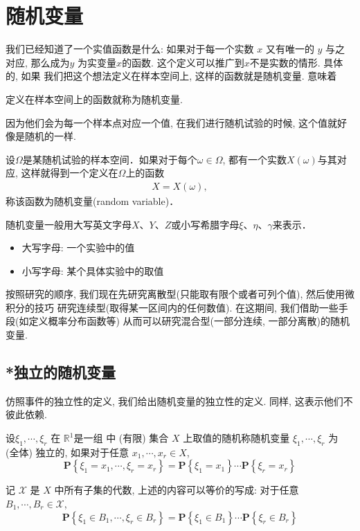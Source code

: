 \section{随机变量}

我们已经知道了一个实值函数是什么: 如果对于每一个实数 $x$ 又有唯一的 $y$ 与之对应,
那么成为$y$ 为实变量$x$的函数. 这个定义可以推广到$x$不是实数的情形. 具体的, 如果
我们把这个想法定义在样本空间上, 这样的函数就是随机变量. 意味着

\begin{definition*}
    定义在样本空间上的函数就称为随机变量.
\end{definition*}

因为他们会为每一个样本点对应一个值, 在我们进行随机试验的时候, 这个值就好像是随机的一样.

\begin{definition}[随机变量]
    设$\Omega$是某随机试验的样本空间．如果对于每个$\omega\in\Omega$, 都有一个实数$X(\omega)$与其对应, 这样就得到一个定义在$\Omega$上的函数
    \begin{align*}
        X=X(\omega),
    \end{align*}
    称该函数为随机变量(random variable)．
\end{definition}
随机变量一般用大写英文字母$X$、$Y$、$Z$或小写希腊字母$\xi$、$\eta$、$\gamma$来表示．
\begin{itemize}
    \item 大写字母: 一个实验中的值
    \item 小写字母: 某个具体实验中的取值
\end{itemize}

按照研究的顺序, 我们现在先研究离散型(只能取有限个或者可列个值), 然后使用微积分的技巧
研究连续型(取得某一区间内的任何数值). 在这期间, 我们借助一些手段(如定义概率分布函数等)
从而可以研究混合型(一部分连续, 一部分离散)的随机变量.

\subsection{*独立的随机变量}

仿照事件的独立性的定义, 我们给出随机变量的独立性的定义. 同样, 这表示他们不彼此依赖. 

\begin{definition}
    设$\xi_1, \cdots, \xi_r$ 在 $\mathbb{R}^1$是一组  中 (有限) 集合 $X$ 上取值的随机称随机变量 $\xi_1, \cdots, \xi_r$ 为 (全体) 独立的, 如果对于任意 $x_1, \cdots, x_r \in X$,
$$
\mathbf{P}\left\{\xi_1=x_1, \cdots, \xi_r=x_r\right\}=\mathbf{P}\left\{\xi_1=x_1\right\} \cdots \mathbf{P}\left\{\xi_r=x_r\right\}
$$
\end{definition}

\begin{shaded}
    记 $\mathscr{X}$ 是 $X$ 中所有子集的代数, 上述的内容可以等价的写成: 对于任意 $B_1, \cdots, B_r \in \mathscr{X}$,
    $$
    \mathbf{P}\left\{\xi_1 \in B_1, \cdots, \xi_r \in B_r\right\}=\mathbf{P}\left\{\xi_1 \in B_1\right\} \cdots \mathbf{P}\left\{\xi_r \in B_r\right\}
    $$
\end{shaded}